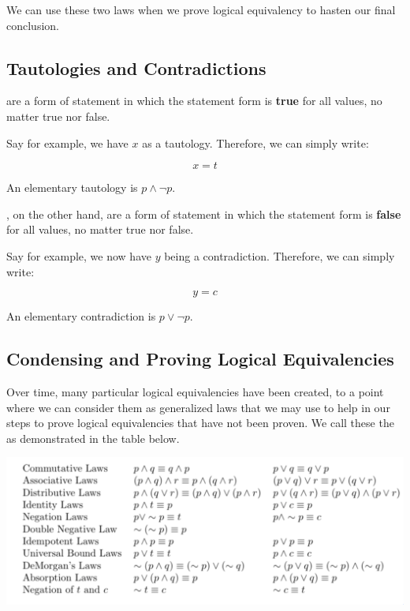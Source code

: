 We can use these two laws when we prove logical equivalency to hasten our final conclusion.

\subsection{Tautologies and Contradictions}
 are a form of statement in which the statement form is \textbf{true} for all values, no matter true nor false.

Say for example, we have \(x\) as a tautology. Therefore, we can simply write:

\begin{displaymath}
    x = t
\end{displaymath}

\begin{example}
    An elementary tautology is $p \land \neg{p}$.
\end{example}

, on the other hand, are a form of statement in which the statement form is \textbf{false} for all values, no matter true nor false.

Say for example, we now have \(y\) being a contradiction. Therefore, we can simply write:

\begin{displaymath}
    y = c
\end{displaymath}

\begin{example}
    An elementary contradiction is $p \lor \neg{p}$.
\end{example}

\subsection{Condensing and Proving Logical Equivalencies}
Over time, many particular logical equivalencies have been created, to a point where we can consider them as generalized laws that we may use to help in our steps to prove logical equivalencies that have not been proven. We call these the  as demonstrated in the table below.

\vspace{0in}\includegraphics[scale=0.4]{media/commonlogicalequivalencies.png} \\

